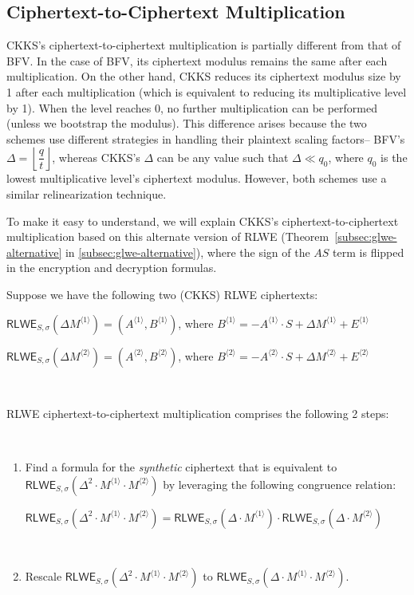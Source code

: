 \subsection{Ciphertext-to-Ciphertext Multiplication}
\label{subsec:ckks-mult-cipher}

CKKS's ciphertext-to-ciphertext multiplication is partially different from that of BFV. In the case of BFV, its ciphertext modulus remains the same after each multiplication. On the other hand, CKKS reduces its ciphertext modulus size by 1 after each multiplication (which is equivalent to reducing its multiplicative level by 1). When the level reaches 0, no further multiplication can be performed (unless we bootstrap the modulus). This difference arises because the two schemes use different strategies in handling their plaintext scaling factors-- BFV's $\Delta = \left\lfloor\dfrac{q}{t}\right\rfloor$, whereas CKKS's $\Delta$ can be any value such that $\Delta \ll q_0$, where $q_0$ is the lowest multiplicative level's ciphertext modulus. However, both schemes use a similar relinearization technique. 

To make it easy to understand, we will explain CKKS's ciphertext-to-ciphertext multiplication based on this alternate version of RLWE (Theorem~\ref*{subsec:glwe-alternative} in \autoref{subsec:glwe-alternative}),
where the sign of the $AS$ term is flipped in the encryption and decryption formulas.

Suppose we have the following two (CKKS) RLWE ciphertexts:

$\textsf{RLWE}_{S, \sigma}(\Delta M^{\langle 1 \rangle}) = (A^{\langle 1 \rangle}, B^{\langle 1 \rangle})$, \text{ } where $B^{\langle 1 \rangle} = -A^{\langle 1 \rangle} \cdot S + \Delta M^{\langle 1 \rangle} + E^{\langle 1 \rangle}$

$\textsf{RLWE}_{S, \sigma}(\Delta M^{\langle 2 \rangle}) = (A^{\langle 2 \rangle}, B^{\langle 2 \rangle})$, \text{ } where $B^{\langle 2 \rangle} = -A^{\langle 2 \rangle} \cdot S + \Delta M^{\langle 2 \rangle} + E^{\langle 2 \rangle}$

$ $

\noindent RLWE ciphertext-to-ciphertext multiplication comprises the following 2 steps:


$ $

\begin{enumerate}
\item Find a formula for the \textit{synthetic} ciphertext that is equivalent to $\textsf{RLWE}_{S, \sigma}(\Delta^2 \cdot M^{\langle 1 \rangle} \cdot M^{\langle 2 \rangle})$ by leveraging the following congruence relation: 

$\textsf{RLWE}_{S, \sigma}(\Delta^2 \cdot M^{\langle 1 \rangle} \cdot M^{\langle 2 \rangle}) = \textsf{RLWE}_{S, \sigma}(\Delta \cdot M^{\langle 1 \rangle}) \cdot \textsf{RLWE}_{S, \sigma}(\Delta \cdot M^{\langle 2 \rangle})$ 

$ $

\item Rescale $\textsf{RLWE}_{S, \sigma}(\Delta^2 \cdot M^{\langle 1 \rangle} \cdot M^{\langle 2 \rangle})$ to $\textsf{RLWE}_{S, \sigma}(\Delta \cdot M^{\langle 1 \rangle} \cdot M^{\langle 2 \rangle})$.
\end{enumerate}

